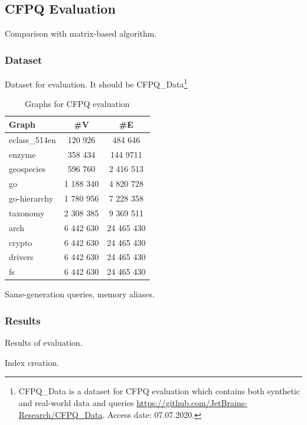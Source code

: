 \subsection{CFPQ Evaluation}

Comparison with matrix-based algorithm.

\subsubsection{Dataset}

Dataset for evaluation. 
It should be CFPQ\_Data\footnote{CFPQ\_Data is a dataset for CFPQ evaluation which contains both synthetic and real-world data and queries \url{https://github.com/JetBrains-Research/CFPQ\_Data}. Access date: 07.07.2020.}

\begin{table}
{
\begin{tabular}{|l|c|c|}
\hline
Graph & \#V & \#E \\
\hline
\hline 
eclass\_514en  & 120 926 & 484 646 \\
enzyme  & 358 434 & 144 9711 \\
geospecies  & 596 760 & 2 416 513 \\
go   & 1 188 340 & 4 820 728 \\
go-hierarchy & 1 780 956 & 7 228 358 \\
taxonomy & 2 308 385 & 9 369 511 \\
\hline
arch & 6 442 630 & 24 465 430 \\
crypto & 6 442 630 & 24 465 430 \\
drivers & 6 442 630 & 24 465 430 \\
fs & 6 442 630 & 24 465 430 \\
\hline
\end{tabular}
}
\caption{Graphs for CFPQ evaluation}
\label{tbl:graphs_for_cfpq}
\end{table}



Same-generation queries, memory aliases.

\subsubsection{Results}

Results of evaluation.

Index creation.

